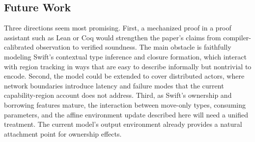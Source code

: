 \subsection{Future Work}

Three directions seem most promising. First, a mechanized proof in a proof assistant such as Lean or Coq would strengthen the paper's claims from compiler-calibrated observation to verified soundness. The main obstacle is faithfully modeling Swift's contextual type inference and closure formation, which interact with region tracking in ways that are easy to describe informally but nontrivial to encode. Second, the model could be extended to cover distributed actors, where network boundaries introduce latency and failure modes that the current capability-region account does not address. Third, as Swift's ownership and borrowing features mature, the interaction between move-only types, consuming parameters, and the affine environment update described here will need a unified treatment. The current model's output environment already provides a natural attachment point for ownership effects.
